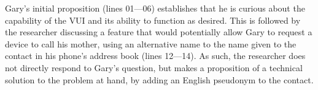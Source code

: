 \begin{revisedsubmission}
Gary's initial proposition (lines 01---06) establishes that he is curious about the capability of the \ac{VUI} and its ability to function as desired.
This is followed by the researcher discussing a feature that would potentially allow Gary to request a device to call his mother, using an alternative name to the name given to the contact in his phone's address book (lines 12---14).
As such, the researcher does not directly respond to Gary's question, but makes a proposition of a technical solution to the problem at hand, by adding an English pseudonym to the contact.
\end{revisedsubmission}






